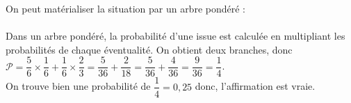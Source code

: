    On peut matérialiser la situation par un arbre pondéré : \\ [7mm]
   \hspace*{3cm}
   {} \\ [7mm]
      Dans un arbre pondéré, la probabilité d'une issue est calculée en multipliant les probabilités de chaque éventualité. On obtient deux branches, donc \\ [2mm]
      $\mathcal{P} =\dfrac56\times\dfrac16+\dfrac16\times\dfrac23 =\dfrac{5}{36}+\dfrac{2}{18} =\dfrac{5}{36}+\dfrac{4}{36} =\dfrac{9}{36} =\dfrac14$. \\ [2mm]
      On trouve bien une probabilité de $\dfrac14 =0,25$ donc, {\blue l'affirmation est vraie}.
